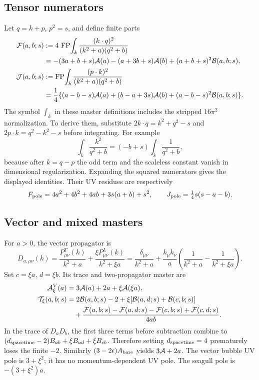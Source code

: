 \documentclass[11pt]{article}
\newcommand{\FP}{\operatorname{FP}}
\begin{document}
\subsection{Tensor numerators}
Let $q=k+p$, $p^2=s$, and define finite parts
\begin{align}
 {\cal F}(a,b;s)
 &:=4\,\FP\!\int_k\frac{(k\cdot q)^2}{(k^2+a)(q^2+b)}
 \nonumber\\
 &=-(3a+b+s){\cal A}(a)-(a+3b+s){\cal A}(b)
       +(a+b+s)^2{\cal B}(a,b;s),\\
 {\cal J}(a,b;s)
 &:=\FP\!\int_k\frac{(p\cdot k)^2}{(k^2+a)(q^2+b)}
 \nonumber\\
 &=\frac14\{(a-b-s){\cal A}(a)+(b-a+3s){\cal A}(b)
       +(a-b-s)^2{\cal B}(a,b;s)\}.
\end{align}
The symbol $\int_k$ in these master definitions includes the stripped
$16\pi^2$ normalization. To derive them, substitute
$2k\cdot q=k^2+q^2-s$ and
$2p\cdot k=q^2-k^2-s$ before integrating. For example
\[
 \int_k\frac{k^2}{q^2+b}=(-b+s)\int_k\frac1{q^2+b},
\]
because after $k=q-p$ the odd term and the scaleless constant vanish in
dimensional regularization. Expanding the squared numerators gives the
displayed identities. Their UV residues are respectively
\begin{equation}
 F_{\rm pole}=4a^2+4b^2+4ab+3s(a+b)+s^2,\qquad
 J_{\rm pole}=\tfrac14s(s-a-b).
\end{equation}

\subsection{Vector and mixed masters}
For $a>0$, the vector propagator is
\begin{equation}
 D_{a,\mu\nu}(k)
 =\frac{P^T_{\mu\nu}(k)}{k^2+a}
       +\frac{\xi P^L_{\mu\nu}(k)}{k^2+\xi a}
 =\frac{\delta_{\mu\nu}}{k^2+a}
 +\frac{k_\mu k_\nu}{a}
   \left(\frac1{k^2+a}-\frac1{k^2+\xi a}\right).
\end{equation}
Set $c=\xi a$, $d=\xi b$. Its trace and two-propagator master are
\begin{align}
 {\cal A}_\xi^V(a)
 &=3{\cal A}(a)+2a+\xi{\cal A}(\xi a),\\
 {\cal T}_\xi(a,b;s)
 &=2{\cal B}(a,b;s)-2
       +\xi[{\cal B}(a,d;s)+{\cal B}(c,b;s)]\nonumber\\
 &\quad+\frac{{\cal F}(a,b;s)-{\cal F}(a,d;s)
                    -{\cal F}(c,b;s)+{\cal F}(c,d;s)}{4ab}.
\end{align}
In the trace of $D_aD_b$, the first three terms before subtraction
combine to $(d_{\rm spacetime}-2)B_{ab}+\xi B_{ad}+\xi B_{cb}$.
Therefore setting $d_{\rm spacetime}=4$ prematurely loses the finite
$-2$. Similarly $(3-2\epsilon)A_{\rm bare}$ yields $3{\cal A}+2a$.
The vector bubble UV pole is $3+\xi^2$; it has no momentum-dependent
UV pole. The seagull pole is $-(3+\xi^2)a$.
\end{document}
